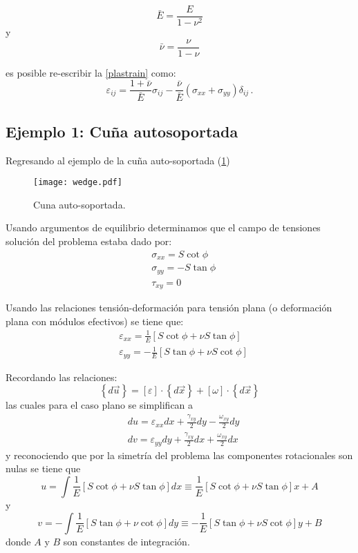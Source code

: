 \documentclass[../notas medios.tex]{subfiles}
\begin{document}
\[\bar E = \frac{E}{{1 - {\nu ^2}}}\]
y
\[\bar \nu  = \frac{\nu }{{1 - \nu }}\]

es posible re-escribir la \cref{plastrain} como:
\[\varepsilon_{ij} = \frac{1 + \bar \nu }{\bar E}\sigma_{ij} - \frac{\bar \nu }{\bar E}(\sigma_{xx} + \sigma_{yy}) \delta_{ij}\, .\]

\subsection*{Ejemplo 1: Cuña autosoportada}
Regresando al ejemplo de la cuña auto-soportada (\cref{wedgee})
\begin{figure}[H]
\centering
	\texttt{[image: wedge.pdf]}
	\caption{Cuna auto-soportada.}
	\label{wedgee}
\end{figure}


Usando argumentos de equilibrio determinamos que el campo de tensiones solución del problema estaba dado por:
\begin{equation} \label{tencuna}
\begin{split}
& \sigma_{xx} = S \cot\phi \\
& \sigma_{yy} =  - S \tan\phi \\
& \tau_{xy} = 0
\end{split}
\end{equation}

Usando las relaciones tensión-deformación para tensión plana (o deformación plana con módulos efectivos) se tiene que:
\begin{align*}
&\varepsilon_{xx} = \frac{1}{E}[S \cot\phi  + \nu S \tan\phi]\\
&\varepsilon_{yy} =  - \frac{1}{E}[S \tan\phi  + \nu S \cot\phi]
\end{align*}

Recordando las relaciones:
\[\left\{ d\vec u \right\} = \left[ \varepsilon  \right] \cdot \left\{ d\vec x \right\} + \left[ \omega  \right] \cdot \left\{ d\vec x\right\}\]
las cuales para el caso plano se simplifican a
\begin{align*}
&du = \varepsilon_{xx}dx + \frac{\gamma_{xy}}{2}dy - \frac{\omega_{xy}}{2}dy\\
&dv = \varepsilon_{yy}dy + \frac{\gamma_{xy}}{2}dx + \frac{\omega_{xy}}{2}dx
\end{align*}
y reconociendo que por la simetría del problema las componentes rotacionales son nulas se tiene que
\[u = \int \frac{1}{E}[ S \cot\phi  + \nu S \tan\phi]dx  \equiv \frac{1}{E}[S \cot\phi  + \nu S \tan\phi]x + A\]
y
\[v =  - \int \frac{1}{E}[S \tan\phi  + \nu \cot\phi]dy  \equiv  - \frac{1}{E}[S \tan\phi  + \nu S \cot\phi]y + B\]
donde $A$ y $B$ son constantes de integración.
\end{document}
